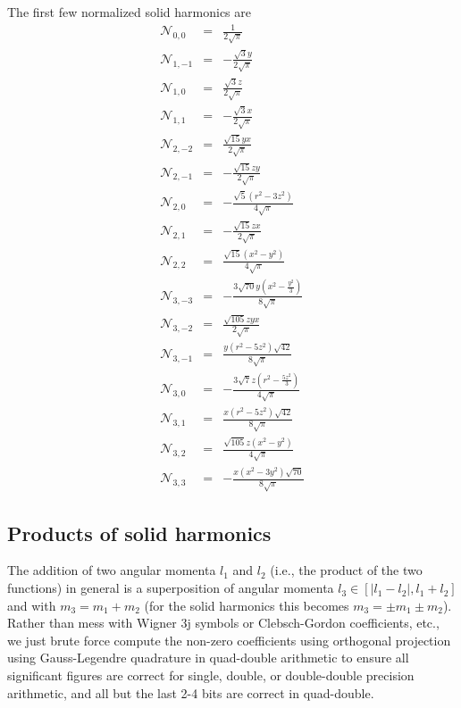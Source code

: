 \documentclass[12pt]{article}
\newcommand{\N}{\mathcal{N}}
\begin{document}
The first few normalized solid harmonics are
\begin{eqnarray}
\N_{0, 0} & = &  \frac{1}{2 \sqrt{\pi}}  \nonumber \\
\N_{1, -1} & = &  -\frac{\sqrt{3} y}{2 \sqrt{\pi}} \nonumber \\
\N_{1, 0} & = &  \frac{\sqrt{3} z}{2 \sqrt{\pi}} \nonumber \\
\N_{1, 1} & = &  -\frac{\sqrt{3} x}{2 \sqrt{\pi}} \nonumber \\
\N_{2, -2} & = &  \frac{\sqrt{15} y x}{2 \sqrt{\pi}} \nonumber \\
\N_{2, -1} & = &  -\frac{\sqrt{15} z y}{2 \sqrt{\pi}} \nonumber \\
\N_{2, 0} & = &  -\frac{\sqrt{5} \left(r^{2}-3 z^{2}\right)}{4 \sqrt{\pi}} \nonumber \\
\N_{2, 1} & = &  -\frac{\sqrt{15} z x}{2 \sqrt{\pi}} \nonumber \\
\N_{2, 2} & = &  \frac{\sqrt{15} \left(x^{2}-y^{2}\right)}{4 \sqrt{\pi}} \nonumber \\
\N_{3, -3} & = &  -\frac{3 \sqrt{70} y \left(x^{2}-\frac{y^{2}}{3}\right)}{8 \sqrt{\pi}} \nonumber \\
\N_{3, -2} & = &  \frac{\sqrt{105} z y x}{2 \sqrt{\pi}} \nonumber \\
\N_{3, -1} & = &  \frac{y \left(r^{2}-5 z^{2}\right) \sqrt{42}}{8 \sqrt{\pi}} \nonumber \\
\N_{3, 0} & = &  -\frac{3 \sqrt{7} z \left(r^{2}-\frac{5 z^{2}}{3}\right)}{4 \sqrt{\pi}}  \nonumber \\
\N_{3, 1} & = &  \frac{x \left(r^{2}-5 z^{2}\right) \sqrt{42}}{8 \sqrt{\pi}} \nonumber \\
\N_{3, 2} & = &  \frac{\sqrt{105} z \left(x^{2}-y^{2}\right)}{4 \sqrt{\pi}} \nonumber \\
\N_{3, 3} & = &  -\frac{x \left(x^{2}-3 y^{2}\right) \sqrt{70}}{8 \sqrt{\pi}} \nonumber
\end{eqnarray}

\subsection{Products of solid harmonics}

The addition of two angular momenta $l_1$ and $l_2$ (i.e., the product of the two functions) in general is a superposition of angular momenta $l_3 \in [|l_1-l_2|,l_1+l_2]$ and with $m_3 = m_1 + m_2$ (for the solid harmonics this becomes $m_3 = \pm m_1 \pm m_2$).  Rather than mess with Wigner 3j symbols or Clebsch-Gordon coefficients, etc., we just brute force compute the non-zero coefficients using orthogonal projection using Gauss-Legendre quadrature in quad-double arithmetic to ensure all significant figures are correct for single, double, or double-double precision arithmetic, and all but the last 2-4 bits are correct in quad-double.
\end{document}
